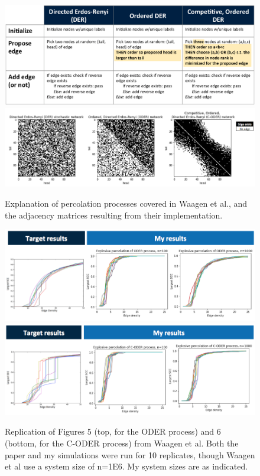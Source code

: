 \documentclass[11pt, oneside]{article}   	%
\begin{document}
\begin{figure}[h]
\centering
\includegraphics[width =\textwidth]{figs/perc-processes.png}
\includegraphics[width =\textwidth]{figs/percolation.png}
\caption{Explanation of percolation processes covered in Waagen et al., and the adjacency matrices resulting from their implementation.}
\label{fig:perc-processes}
\end{figure}

\begin{figure}[h]
\centering
\includegraphics[width =\textwidth]{figs/fig5-oder.png}
\includegraphics[width =\textwidth]{figs/fig6-coder.png}
\caption{Replication of Figures 5 (top, for the ODER process) and 6 (bottom, for the C-ODER process) from Waagen et al. Both the paper and my simulations were run for 10 replicates, though Waagen et al use a system size of n=1E6. My system sizes are as indicated.}
\label{fig:fig56}
\end{figure}
\end{document}
